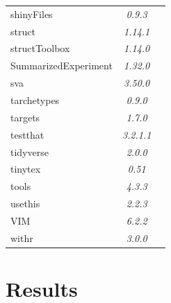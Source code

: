 \documentclass[ENG, BIB]{TFUOC}%
\begin{document}
\begin{longtable}[c]{@{}lcc@{}}
    shinyFiles                           & \textit{0.9.3}   & \cite{R-shinyFiles}           \\
    struct                               & \textit{1.14.1}  & \cite{R-struct}               \\
    structToolbox                        & \textit{1.14.0}  & \cite{R-structToolbox}        \\
    SummarizedExperiment                 & \textit{1.32.0}  & \cite{R-SummarizedExperiment} \\
    sva                                  & \textit{3.50.0}  & \cite{R-sva}                  \\
    tarchetypes                          & \textit{0.9.0}   & \cite{R-tarchetypes}          \\
    targets                              & \textit{1.7.0}   & \cite{R-targets}              \\
    testthat                             & \textit{3.2.1.1} & \cite{R-testthat}             \\
    tidyverse                            & \textit{2.0.0}   & \cite{R-tidyverse}            \\
    tinytex                              & \textit{0.51}    & \cite{R-tinytex}              \\
    tools                                & \textit{4.3.3}   & \cite{R-core}                 \\
    usethis                              & \textit{2.2.3}   & \cite{R-usethis}              \\
    VIM                                  & \textit{6.2.2}   & \cite{R-VIM}                  \\
    withr                                & \textit{3.0.0}   & \cite{R-withr}                \\* \bottomrule
\end{longtable}






\chapter{Results}
\end{document}
